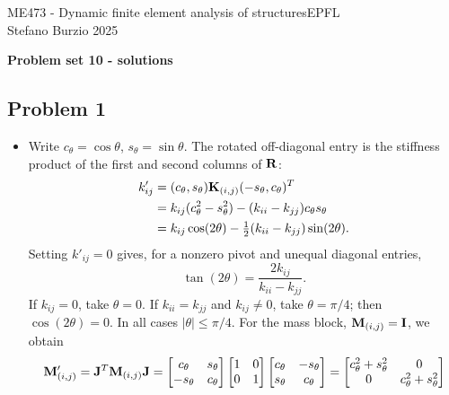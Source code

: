 \documentclass[12pt]{article}
\begin{document}
\noindent ME473 - Dynamic finite element analysis of structures\hfill EPFL\\
Stefano Burzio \hfill 2025\\
\vspace{0.3cm}

\hspace*{\fill}\textbf{\Large Problem set 10 - solutions}\hspace*{\fill}

\hrulefill

\subsection*{Problem 1}
\begin{itemize}
   \item[a)] Write $c_\theta=\cos\theta$, $s_\theta=\sin\theta$. The rotated off-diagonal entry is the stiffness product of the first
         and second columns of $\mathbf{R}$:
         \begin{align*}
            k'_{ij}
             & = (c_\theta,s_\theta)\mathbf{K}_{(i,j)}(-s_\theta,c_\theta)^{T}  \\
             & =k_{ij}(c_\theta^2-s_\theta^2)
            -(k_{ii}-k_{jj})c_\theta s_\theta                             \\
             & =k_{ij}\cos(2\theta)-\tfrac12(k_{ii}-k_{jj})\sin(2\theta).
         \end{align*}
         Setting $k'_{ij}=0$ gives, for a nonzero pivot and unequal diagonal entries,
         \[
            \tan(2\theta)=\frac{2k_{ij}}{k_{ii}-k_{jj}}.
         \]
         If $k_{ij}=0$, take $\theta=0$. If $k_{ii}=k_{jj}$ and $k_{ij}\ne0$,
         take $\theta=\pi/4$; then $\cos(2\theta)=0$. In all cases
         $|\theta|\leq\pi/4$. For the mass block, $\mathbf{M}_{(i,j)}=\mathbf{I}$, we obtain
         \[
            \mathbf{M}_{(i,j)}'=\mathbf{J}^{T}\mathbf{M}_{(i,j)}\mathbf{J}
            =\begin{bmatrix}c_\theta&s_\theta\\-s_\theta&c_\theta\end{bmatrix}
            \begin{bmatrix}1&0\\0&1\end{bmatrix}
            \begin{bmatrix}c_\theta&-s_\theta\\s_\theta&c_\theta\end{bmatrix}
            =\begin{bmatrix}c_\theta^2+s_\theta^2&0\\0&c_\theta^2+s_\theta^2\end{bmatrix}
\]
\end{itemize}
\end{document}
